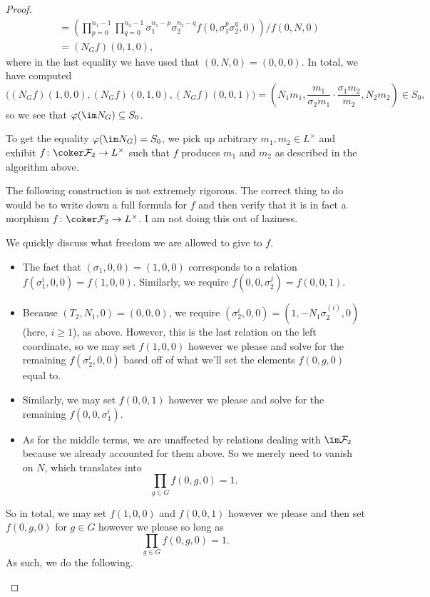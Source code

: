 \documentclass{article}
\begin{document}
\begin{proof}
\begin{align*}
		&= \left(\prod_{p=0}^{n_1-1}\prod_{q=0}^{n_2-1}\sigma_1^{n_1-p}\sigma_2^{n_2-q}f\left(0,\sigma_1^p\sigma_2^q,0\right)\right)\bigg/f(0,N,0) \\
		&= (N_Gf)(0,1,0),
	\end{align*}
	where in the last equality we have used that $(0,N,0)=(0,0,0)$. In total, we have computed
	\[\big((N_Gf)(1,0,0),(N_Gf)(0,1,0),(N_Gf)(0,0,1)\big)=\left(N_1m_1,\frac{m_1}{\sigma_2m_1}\cdot\frac{\sigma_1m_2}{m_2},N_2m_2\right)\in S_0,\]
	so we see that $\varphi(\im N_G)\subseteq S_0$.

	To get the equality $\varphi(\im N_G)=S_0$, we pick up arbitrary $m_1,m_2\in L^\times$ and exhibit $f\colon\coker\mathcal F_2\to L^\times$ such that $f$ produces $m_1$ and $m_2$ as described in the algorithm above.
	\begin{warn}
		The following construction is not extremely rigorous. The correct thing to do would be to write down a full formula for $f$ and then verify that it is in fact a morphism $f\colon\coker\mathcal F_2\to L^\times$. I am not doing this out of laziness.
	\end{warn}
	We quickly discuss what freedom we are allowed to give to $f$.
	\begin{itemize}
		\item The fact that $(\sigma_1,0,0)=(1,0,0)$ corresponds to a relation $f\left(\sigma_1^i,0,0\right)=f(1,0,0)$. Similarly, we require $f\left(0,0,\sigma_2^j\right)=f(0,0,1)$.
		\item Because $(T_2,N_1,0)=(0,0,0)$, we require $(\sigma_2^i,0,0)=(1,-N_1\sigma_2^{(i)},0)$ (here, $i\ge1$), as above. However, this is the last relation on the left coordinate, so we may set $f(1,0,0)$ however we please and solve for the remaining $f\left(\sigma_2^i,0,0\right)$ based off of what we'll set the elements $f(0,g,0)$ equal to.
		\item Similarly, we may set $f(0,0,1)$ however we please and solve for the remaining $f\left(0,0,\sigma_1^i\right)$.
		\item As for the middle terms, we are unaffected by relations dealing with $\im\mathcal F_2$ because we already accounted for them above. So we merely need to vanish on $N$, which translates into
		\[\prod_{g\in G}f(0,g,0)=1.\]
	\end{itemize}
	So in total, we may set $f(1,0,0)$ and $f(0,0,1)$ however we please and then set $f(0,g,0)$ for $g\in G$ however we please so long as
	\[\prod_{g\in G}f(0,g,0)=1.\]
	As such, we do the following.
	\begin{itemize}

\end{itemize}
\end{proof}
\end{document}
